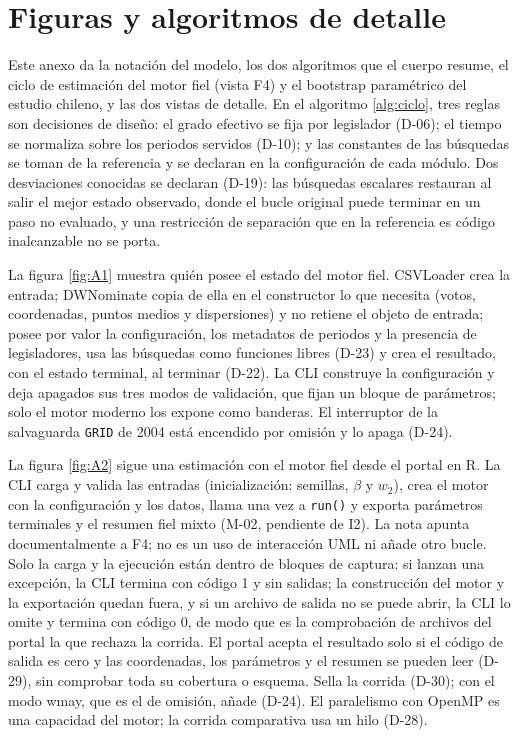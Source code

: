 \chapter{Figuras y algoritmos de detalle}
\label{anexo:figuras}

Este anexo da la notación del modelo, los dos algoritmos que el cuerpo resume, el ciclo de
estimación del motor fiel (vista F4) y el bootstrap paramétrico del estudio chileno, y las dos
vistas de detalle. En el algoritmo \ref{alg:ciclo}, tres reglas son decisiones de diseño: el
grado efectivo se fija por legislador (D-06); el tiempo se normaliza sobre los periodos
servidos (D-10); y las constantes de las búsquedas se toman de la referencia y se declaran en
la configuración de cada módulo. Dos desviaciones conocidas se declaran (D-19): las búsquedas
escalares restauran al salir el mejor estado observado, donde el bucle original puede terminar
en un paso no evaluado, y una restricción de separación que en la referencia es código
inalcanzable no se porta.

La figura \ref{fig:A1} muestra quién posee el estado del motor fiel. CSVLoader crea la
entrada; DWNominate copia de ella en el constructor lo que necesita (votos, coordenadas,
puntos medios y dispersiones) y no retiene el objeto de entrada; posee por valor la
configuración, los metadatos de periodos y la presencia de legisladores, usa las búsquedas
como funciones libres (D-23) y crea el resultado, con el estado terminal, al terminar (D-22).
La CLI construye la configuración y deja apagados sus tres modos de validación, que fijan un
bloque de parámetros; solo el motor moderno los expone como banderas. El interruptor de la
salvaguarda \texttt{GRID} de 2004 está encendido por omisión y  lo
apaga (D-24).

La figura \ref{fig:A2} sigue una estimación con el motor fiel desde el portal en R. La CLI
carga y valida las entradas (inicialización: semillas, $\beta$ y $w_2$), crea el motor con la
configuración y los datos, llama una vez a \texttt{run()} y exporta parámetros terminales
y el resumen fiel mixto (M-02, pendiente de I2).
La nota apunta documentalmente a F4; no es un uso de interacción UML ni añade otro bucle. Solo la carga y la ejecución están dentro de
bloques de captura: si lanzan una excepción, la CLI termina con código 1 y sin salidas; la
construcción del motor y la exportación quedan fuera, y si un archivo de salida no se puede
abrir, la CLI lo omite y termina con código 0, de modo que es la comprobación de archivos del
portal la que rechaza la corrida. El portal acepta el
resultado solo si el código de salida es cero y las coordenadas, los parámetros y el resumen
se pueden leer (D-29), sin comprobar toda su cobertura o esquema. Sella la corrida (D-30);
con el modo wmay, que es el de omisión, añade
 (D-24). El paralelismo con OpenMP es una capacidad del motor; la
corrida comparativa usa un hilo (D-28).


